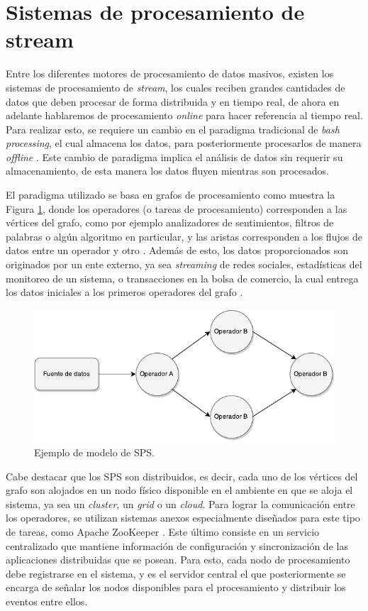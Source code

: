 \section{Sistemas de procesamiento de stream}
\label{sec:SPS}

Entre los diferentes motores de procesamiento de datos masivos, existen los sistemas de procesamiento de \textsl{stream}, los cuales reciben grandes cantidades de datos que deben procesar de forma distribuida y en tiempo real, de ahora en adelante hablaremos de procesamiento \textsl{online} para hacer referencia al tiempo real. Para realizar esto, se requiere un cambio en el paradigma tradicional de \textsl{bash processing}, el cual almacena los datos, para posteriormente procesarlos de manera \textit{offline} \citep{HawwashN14}. Este cambio de paradigma implica el análisis de datos sin requerir su almacenamiento, de esta manera los datos fluyen mientras son procesados.

El paradigma utilizado se basa en grafos de procesamiento como muestra la Figura \ref{fig:grafo}, donde los operadores (o tareas de procesamiento) corresponden a las vértices del grafo, como por ejemplo analizadores de sentimientos, filtros de palabras o algún algoritmo en particular, y las aristas corresponden a los flujos de datos entre un operador y otro \citep{Shahrivari14}. Además de esto, los datos proporcionados son originados por un ente externo, ya sea \textit{streaming} de redes sociales, estadísticas del monitoreo de un sistema, o transacciones en la bolsa de comercio, la cual entrega los datos iniciales a los primeros operadores del grafo \citep{AppelFFB12}.

\begin{figure}[ht!]
  \centering
    \includegraphics[scale=1]{images/SPS.pdf}
  \caption{Ejemplo de modelo de SPS.}
  \label{fig:grafo}
\end{figure}

Cabe destacar que los SPS son distribuidos, es decir, cada uno de los vértices del grafo son alojados en un nodo físico disponible en el ambiente en que se aloja el sistema, ya sea un \textit{cluster}, un \textit{grid} o un \textit{cloud}. Para lograr la comunicación entre los operadores, se utilizan sistemas anexos especialmente diseñados para este tipo de tareas, como Apache ZooKeeper \citep{HuntKJR10}. Este último consiste en un servicio centralizado que mantiene información de configuración y sincronización de las aplicaciones distribuidas que se posean. \normalsize{Para esto, cada nodo de procesamiento debe registrarse en el sistema, y es el servidor central el que posteriormente se encarga de señalar los nodos disponibles para el procesamiento y distribuir los eventos entre ellos.}

